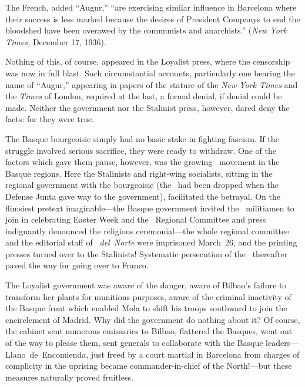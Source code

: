 \indexNYT
The French, added ``Augur,'' ``are exercising similar influence in Barcelona where their success is less marked because the desires of President Companys to end the bloodshed have been overawed by the communists and anarchists.'' (\emph{New York Times,} December 17, 1936).

Nothing of this, of course, appeared in the Loyalist press, where the censorship was now in full blast. Such circumstantial accounts, particularly one bearing the name of ``Augur,'' appearing in papers of the stature of the \emph{New York Times} and the \emph{Times} of London, required at the last, a formal denial, if denial could be made. Neither the government nor the Stalinist press, however, dared deny the facts: for they were true.

\indexCNT{}
The Basque bourgeoisie simply had no basic stake in fighting fascism. If the struggle involved serious sacrifice, they were ready to withdraw. One of the factors which gave them pause, however, was the growing \CNT\ movement in the Basque regions. Here the Stalinists and right-wing socialists, sitting in the regional government with the bourgeoisie (the \CNT\ had been dropped when the Defense Junta gave way to the government), facilitated the betrayal. On the flimsiest pretext imaginable---the Basque government invited the \CNT\ militiamen to join in celebrating Easter Week and the \CNT\ Regional Committee and press indignantly denounced the religious ceremonial---the whole regional committee and the editorial staff of \emph{\CNT~del~Norte} were imprisoned March~26, and the printing presses turned over to the Stalinists! Systematic persecution of the \CNT\ thereafter paved the way for going over to Franco.
\noclub

The Loyalist government was aware of the danger, aware of Bilbao’s failure to transform her plants for munitions purposes, aware of the criminal inactivity of the Basque front which enabled Mola to shift his troops southward to join the encirclement of Madrid. Why did the government do nothing about it? Of course, the cabinet sent numerous emissaries to Bilbao, flattered the Basques, went out of the way to please them, sent generals to collaborate with the Basque leaders---Llano~de~Encomienda, just freed by a court martial in Barcelona from charges of complicity in the uprising became commander-in-chief of the North!---but these measures naturally proved fruitless.

